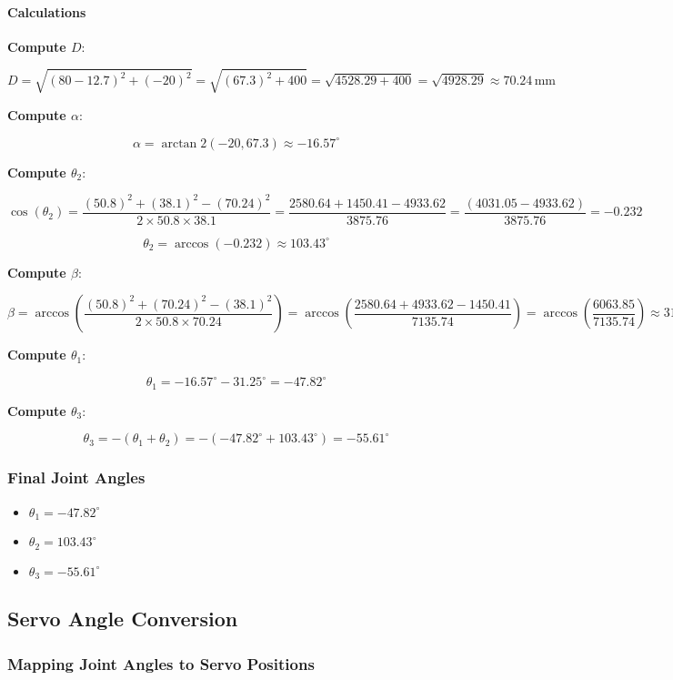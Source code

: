 \documentclass{article}
\begin{document}
\paragraph{Calculations}

\textbf{Compute $D$}:

\[
D = \sqrt{(80 - 12.7)^2 + (-20)^2} = \sqrt{(67.3)^2 + 400} = \sqrt{4528.29 + 400} = \sqrt{4928.29} \approx 70.24\,\text{mm}
\]

\textbf{Compute $\alpha$}:

\[
\alpha = \arctan2(-20, 67.3) \approx -16.57^\circ
\]

\textbf{Compute $\theta_2$}:

\[
\cos(\theta_2) = \frac{(50.8)^2 + (38.1)^2 - (70.24)^2}{2 \times 50.8 \times 38.1} = \frac{2580.64 + 1450.41 - 4933.62}{3875.76} = \frac{(4031.05 - 4933.62)}{3875.76} = -0.232
\]

\[
\theta_2 = \arccos(-0.232) \approx 103.43^\circ
\]

\textbf{Compute $\beta$}:

\[
\beta = \arccos\left( \frac{(50.8)^2 + (70.24)^2 - (38.1)^2}{2 \times 50.8 \times 70.24} \right) = \arccos\left( \frac{2580.64 + 4933.62 - 1450.41}{7135.74} \right) = \arccos\left( \frac{6063.85}{7135.74} \right) \approx 31.25^\circ
\]

\textbf{Compute $\theta_1$}:

\[
\theta_1 = -16.57^\circ - 31.25^\circ = -47.82^\circ
\]

\textbf{Compute $\theta_3$}:

\[
\theta_3 = -(\theta_1 + \theta_2) = -(-47.82^\circ + 103.43^\circ) = -55.61^\circ
\]

\subsubsection{Final Joint Angles}

\begin{itemize}
    \item $\theta_1 = -47.82^\circ$
    \item $\theta_2 = 103.43^\circ$
    \item $\theta_3 = -55.61^\circ$
\end{itemize}

\subsection{Servo Angle Conversion}

\subsubsection{Mapping Joint Angles to Servo Positions}
\end{document}
